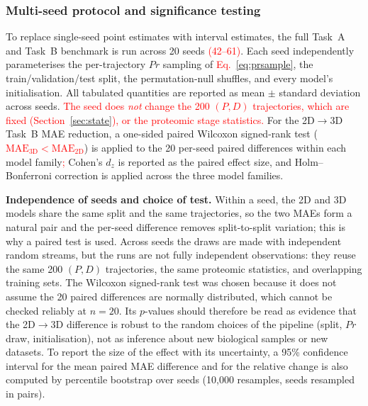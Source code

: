 \documentclass[5p,times,twocolumn]{elsarticle}
\newcommand{\rtag}[1]{}
\newcommand{\rev}[2]{\rtag{#1}\textcolor{red}{#2}}
\newenvironment{revblock}[1]{\par\color{red}\rtag{#1}\ignorespaces}{\par}
\newcommand{\lang}[1]{\textcolor{red}{#1}}
\begin{document}
\subsubsection{Multi-seed protocol and significance testing}
\label{sec:multiseed}

To replace single-seed point estimates with interval
estimates, the full Task~A and Task~B benchmark is run across
20 seeds \rev{R1.4,R2.9}{(42--61)}. Each seed independently parameterises the
per-trajectory $Pr$ sampling of \rev{AC}{Eq.~\eqref{eq:prsample}}, the
train/validation/test split, the permutation-null shuffles,
and every model's initialisation. All tabulated quantities
are reported as mean $\pm$ standard deviation across seeds.
\rev{R1.4,R2.9}{The seed does \textit{not} change the 200
  $(P, D)$ trajectories, which are fixed (Section~\ref{sec:state}),
  or the proteomic stage statistics.}
For the 2D$\to$3D Task~B MAE reduction, a one-sided paired
Wilcoxon signed-rank test (\rev{AC}{$\text{MAE}_{3\text{D}} <
\text{MAE}_{2\text{D}}$}) is applied to the 20 per-seed paired
differences within each model family\lang{;} Cohen's $d_{z}$ is
reported as the paired effect size, and Holm--Bonferroni
correction is applied across the three model families.

\begin{revblock}{R2.9,R1.4}
  \textbf{Independence of seeds and choice of test.}
  Within a seed, the 2D and 3D models share the same split and
  the same trajectories, so the two MAEs form a natural pair and
  the per-seed difference removes split-to-split variation; this
  is why a paired test is used. Across seeds the draws are made
  with independent random streams, but the runs are not fully
  independent observations: they reuse the same 200 $(P, D)$
  trajectories, the same proteomic statistics, and overlapping
  training sets. The Wilcoxon signed-rank test was chosen
  because it does not assume the 20 paired differences are
  normally distributed, which cannot be checked reliably at
  $n = 20$. Its $p$-values should therefore be read as evidence
  that the 2D$\to$3D difference is robust to the random choices
  of the pipeline (split, $Pr$ draw, initialisation), not as
  inference about new biological samples or new datasets.
  To report the size of the effect with its uncertainty, a 95\%
  confidence interval for the mean paired MAE difference and for
  the relative change is also computed by percentile bootstrap
  over seeds (10,000 resamples, seeds resampled in pairs).
\end{revblock}
\end{document}

